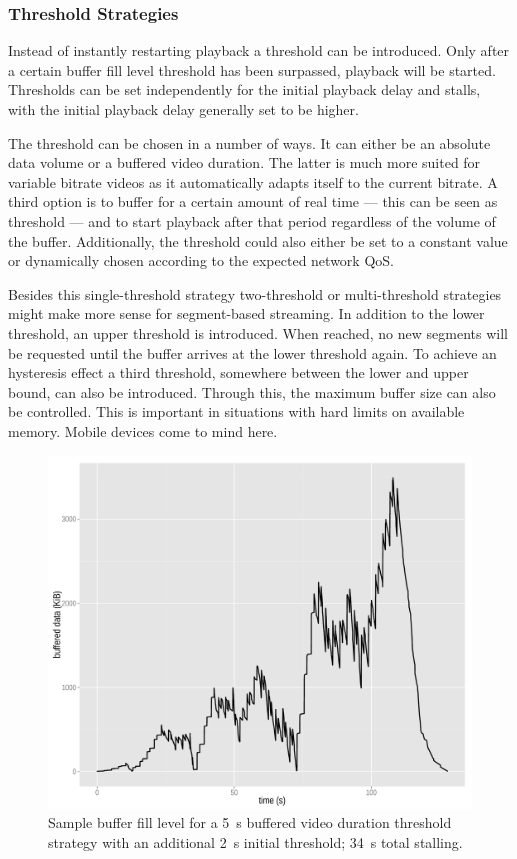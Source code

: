 \subsubsection{Threshold Strategies}

Instead of instantly restarting playback a threshold can be introduced. Only after a certain buffer fill level threshold has been surpassed, playback will be started. Thresholds can be set independently for the initial playback delay and stalls, with the initial playback delay generally set to be higher.

The threshold can be chosen in a number of ways. It can either be an absolute data volume or a buffered video duration. The latter is much more suited for variable bitrate videos as it automatically adapts itself to the current bitrate. A third option is to buffer for a certain amount of real time --- this can be seen as threshold --- and to start playback after that period regardless of the volume of the buffer. Additionally, the threshold could also either be set to a constant value or dynamically chosen according to the expected network \gls{QoS}.

Besides this single-threshold strategy two-threshold or multi-threshold strategies might make more sense for segment-based streaming. In addition to the lower threshold, an upper threshold is introduced. When reached, no new segments will be requested until the buffer arrives at the lower threshold again. To achieve an hysteresis effect a third threshold, somewhere between the lower and upper bound, can also be introduced. Through this, the maximum buffer size can also be controlled. This is important in situations with hard limits on available memory. Mobile devices come to mind here.


\begin{figure}[htb]
	\centering
	\includegraphics[width=1.0\textwidth]{images/R-bufferlevel-flash.pdf}
	\caption{Sample buffer fill level for a \SI{5}{\second} buffered video duration threshold strategy with an additional \SI{2}{\second} initial threshold; \SI{34}{\second} total stalling.}
\label{c3:fig:bufferlevel-flash}
\end{figure}

